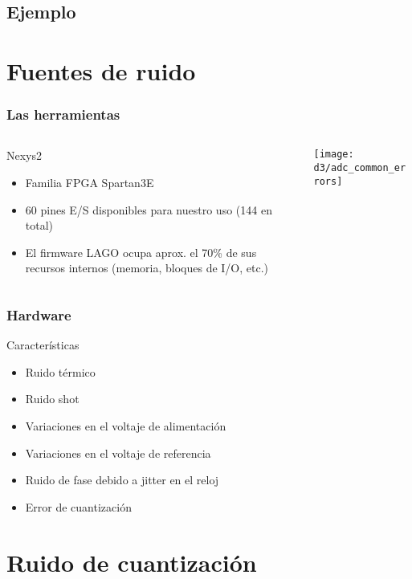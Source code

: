 \documentclass{beamer}
\begin{document}
\subsection{Ejemplo}

\section{Fuentes de ruido}

\begin{frame}
\frametitle{Las herramientas}
  \begin{columns}
    \begin{column}{0.45\textwidth}
      \begin{block}{Nexys2}
        \begin{itemize}
          \item  Familia FPGA Spartan3E
          \item  60 pines E/S disponibles para nuestro uso (144 en total)
          \item  El firmware LAGO ocupa aprox. el 70\% de sus recursos internos
                 (memoria, bloques de I/O, etc.)
        \end{itemize}
      \end{block}
    \end{column} 
    \begin{column}{0.65\textwidth}
      \texttt{[image: d3/adc\_common\_errors]}
    \end{column}
  \end{columns}
\end{frame}

\begin{frame}
	\frametitle{Hardware}
		\begin{exampleblock}{Características}
			\begin{itemize}
				\item Ruido térmico
				\item Ruido shot
				\item Variaciones en el voltaje de alimentación
				\item Variaciones en el voltaje de referencia
				\item Ruido de fase debido a jitter en el reloj
				\item Error de cuantización
			\end{itemize}
		\end{exampleblock}
\end{frame}
\section{Ruido de cuantización}
\end{document}
